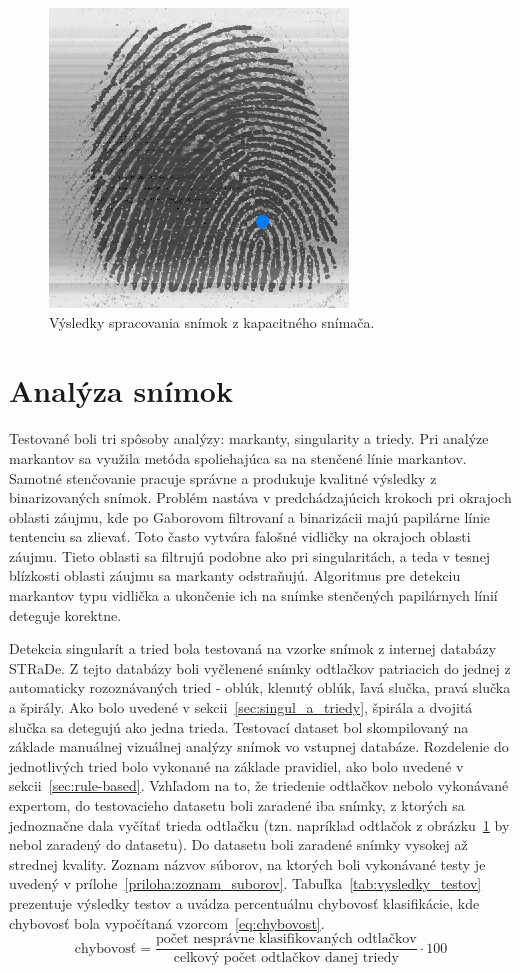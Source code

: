 \begin{figure}[h]
    \includegraphics[width=0.32\linewidth]{obrazky-figures/eval_results/capac_singularities.png}
    \caption{Výsledky spracovania snímok z kapacitného snímača.}
    \label{obr:vyhodnotenie_capac}
  \end{figure}

  \section{Analýza snímok}
  Testované boli tri spôsoby analýzy: markanty, singularity a triedy. Pri analýze markantov sa využila metóda spoliehajúca sa na stenčené línie markantov.
  Samotné stenčovanie pracuje správne a produkuje kvalitné výsledky z binarizovaných snímok. Problém nastáva v predchádzajúcich krokoch pri okrajoch oblasti
  záujmu, kde po Gaborovom filtrovaní a binarizácii majú papilárne línie tentenciu sa zlievať. Toto často vytvára falošné vidličky na okrajoch oblasti
  záujmu. Tieto oblasti sa filtrujú podobne ako pri singularitách, a teda v tesnej blízkosti oblasti záujmu sa markanty odstraňujú.
  Algoritmus pre detekciu markantov typu vidlička a ukončenie ich na snímke stenčených papilárnych línií deteguje korektne.

  Detekcia singularít a tried bola testovaná na vzorke snímok z internej databázy STRaDe. Z tejto databázy boli vyčlenené snímky odtlačkov patriacich do
  jednej z automaticky rozoznávaných tried - oblúk, klenutý oblúk, ľavá slučka, pravá slučka a špirály. Ako bolo uvedené v sekcii~{\ref{sec:singul_a_triedy}},
  špirála a dvojitá slučka sa detegujú ako jedna trieda. Testovací dataset bol skompilovaný na základe manuálnej vizuálnej analýzy snímok vo vstupnej
  databáze. Rozdelenie do jednotlivých tried bolo vykonané na základe pravidiel, ako bolo uvedené v sekcii~{\ref{sec:rule-based}}. Vzhľadom na to, že
  triedenie odtlačkov nebolo vykonávané expertom, do testovacieho datasetu boli zaradené iba snímky, z ktorých sa jednoznačne dala vyčítať trieda odtlačku
  (tzn. napríklad odtlačok z obrázku~{\ref{obr:vyhodnotenie_capac}} by nebol zaradený do datasetu).
  Do datasetu boli zaradené snímky vysokej až strednej kvality. Zoznam názvov súborov, na ktorých boli vykonávané testy je uvedený v
  prílohe~{\ref{priloha:zoznam_suborov}}. Tabuľka~{\ref{tab:vysledky_testov}} prezentuje výsledky testov a uvádza percentuálnu chybovosť klasifikácie, kde
  chybovosť bola vypočítaná vzorcom~{\ref{eq:chybovost}}.
  \begin{equation}
    \text{chybovosť} = \frac{\text{počet nesprávne klasifikovaných odtlačkov}}{\text{celkový počet odtlačkov danej triedy}} \cdot 100
    \label{eq:chybovost}
  \end{equation}

